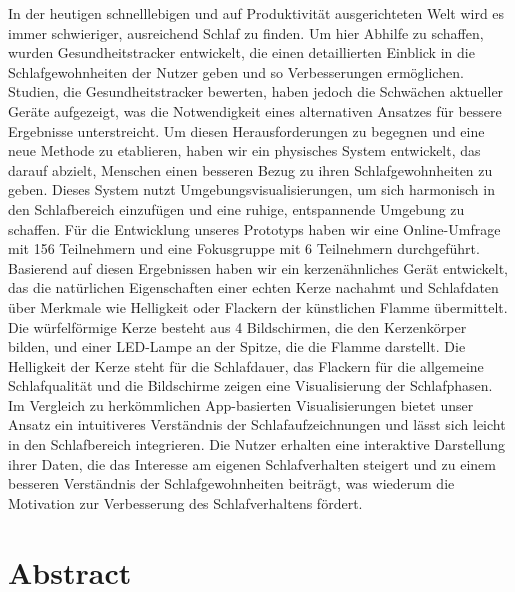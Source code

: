 \documentclass[
  a4paper,  %
  twoside,  %
  bibliography=totoc,
  headsepline,
  cleardoublepage=empty,
  parskip=half,
  draft=false
]{scrbook}
\begin{document}
In der heutigen schnelllebigen und auf Produktivität ausgerichteten Welt wird es immer schwieriger, ausreichend Schlaf zu finden. Um hier Abhilfe zu schaffen, wurden Gesundheitstracker entwickelt, die einen detaillierten Einblick in die Schlafgewohnheiten der Nutzer geben und so Verbesserungen ermöglichen. Studien, die Gesundheitstracker bewerten, haben jedoch die Schwächen aktueller Geräte aufgezeigt, was die Notwendigkeit eines alternativen Ansatzes für bessere Ergebnisse unterstreicht.
Um diesen Herausforderungen zu begegnen und eine neue Methode zu etablieren, haben wir ein physisches System entwickelt, das darauf abzielt, Menschen einen besseren Bezug zu ihren Schlafgewohnheiten zu geben. Dieses System nutzt Umgebungsvisualisierungen, um sich harmonisch in den Schlafbereich einzufügen und eine ruhige, entspannende Umgebung zu schaffen.
Für die Entwicklung unseres Prototyps haben wir eine Online-Umfrage mit 156 Teilnehmern und eine Fokusgruppe mit 6 Teilnehmern durchgeführt. Basierend auf diesen Ergebnissen haben wir ein kerzenähnliches Gerät entwickelt, das die natürlichen Eigenschaften einer echten Kerze nachahmt und Schlafdaten über Merkmale wie Helligkeit oder Flackern der künstlichen Flamme übermittelt. Die würfelförmige Kerze besteht aus 4 Bildschirmen, die den Kerzenkörper bilden, und einer LED-Lampe an der Spitze, die die Flamme darstellt. Die Helligkeit der Kerze steht für die Schlafdauer, das Flackern für die allgemeine Schlafqualität und die Bildschirme zeigen eine Visualisierung der Schlafphasen.
Im Vergleich zu herkömmlichen App-basierten Visualisierungen bietet unser Ansatz ein intuitiveres Verständnis der Schlafaufzeichnungen und lässt sich leicht in den Schlafbereich integrieren. Die Nutzer erhalten eine interaktive Darstellung ihrer Daten, die das Interesse am eigenen Schlafverhalten steigert und zu einem besseren Verständnis der Schlafgewohnheiten beiträgt, was wiederum die Motivation zur Verbesserung des Schlafverhaltens fördert.

\cleardoublepage

\section*{Abstract}
\end{document}

